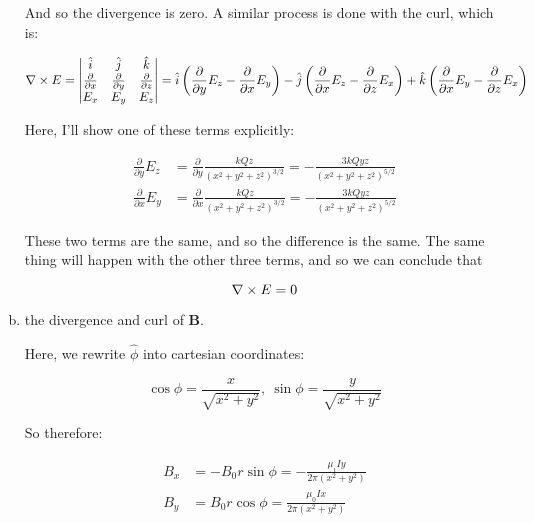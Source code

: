 \documentclass[10pt]{article}
\begin{document}
\begin{enumerate}[(a)]
\begin{solution}
            And so the divergence is zero. A similar process is done with the curl, which is: 

            \begin{align*}
                \nabla \times E = \begin{vmatrix}
                    \hat i & \hat j & \hat k\\
                    \frac{\partial}{\partial x} & \frac{\partial}{\partial y} & \frac{\partial}{\partial z}\\
                    E_x & E_y & E_z
                \end{vmatrix} = \hat i\left(\frac{\partial}{\partial y}E_z - \frac{\partial}{\partial x}E_y\right) - \hat j \left( \frac{\partial}{\partial x}E_z - \frac{\partial}{\partial z}E_x\right) + \hat k \left( \frac{\partial}{\partial x}E_y - \frac{\partial}{\partial z}E_x\right)
            \end{align*}

            Here, I'll show one of these terms explicitly: 

            \begin{align*}
                \frac{\partial}{\partial y} E_z &= \frac{\partial}{\partial y} \frac{kQz}{(x^2 + y^2 + z^2)^{3/2}} = -\frac{3kQyz}{(x^2 + y^2 + z^2)^{5/2}}\\
                \frac{\partial}{\partial x} E_y &= \frac{\partial}{\partial x} \frac{kQz}{(x^2 + y^2 + z^2)^{3/2}} = -\frac{3kQyz}{(x^2 + y^2 + z^2)^{5/2}}
            \end{align*}

            These two terms are the same, and so the difference is the same. The same thing will happen with the other three terms, and so we can conclude that 

            \[ \nabla \times E = 0 \] 

        \end{solution}
        \item the divergence and curl of $\mathbf B$.

        \begin{solution}
            Here, we rewrite $\hat \phi$ into cartesian coordinates: 

            \[ \cos \phi = \frac{x}{\sqrt{x^2 + y^2}}, \ \sin \phi = \frac{y}{\sqrt{x^2 + y^2}}\]

            So therefore: 

            \begin{align*}
                B_x &= - B_0 r \sin \phi = - \frac{\mu_i I y}{2\pi (x^2 + y^2)}\\
                B_y &= B_0 r\cos \phi = \frac{\mu_0 I x}{2\pi (x^2 + y^2)} 
            \end{align*}
            

\end{solution}
\end{enumerate}
\end{document}
